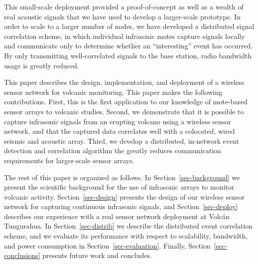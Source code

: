 This small-scale deployment provided a proof-of-concept as well as a
wealth of real acoustic signals that we have used to develop a
larger-scale prototype. In order to scale to a larger number of nodes,
we have developed a distributed signal correlation scheme, in which
individual infrasonic motes capture signals locally and communicate only
to determine whether an ``interesting'' event has occurred. By only
transmitting well-correlated signals to the base station, radio 
bandwidth usage is greatly reduced.

This paper describes the design, implementation, and deployment of a
wireless sensor network for volcanic monitoring. This paper makes the
following contributions. First, this is the first application to our
knowledge of mote-based sensor arrays to volcanic studies. Second, we 
demonstrate that it is possible to capture infrasonic signals from 
an erupting volcano using a wireless sensor network, and that the 
captured data correlates well with a colocated, wired seismic 
and acoustic array. Third, we develop a distributed, in-network event 
detection and correlation algorithm the greatly reduces communication
requirements for larger-scale sensor arrays. 

The rest of this paper is organized as follows. In
Section~\ref{sec-background} we present the scientific background
for the use of infrasonic arrays to monitor volcanic activity.
Section~\ref{sec-design} presents the design of our wireless sensor
network for capturing continuous infrasonic signals, and 
Section~\ref{sec-deploy} describes our experience with a real sensor
network deployment at Volc\'{a}n Tungurahua. In Section~\ref{sec-distrib}
we describe the distributed event correlation scheme, and
we evaluate its 
performance with respect to scalability, bandwidth, and power
consumption in Section~\ref{sec-evaluation}. Finally, Section~\ref{sec-conclusions} presents future work 
and concludes.



